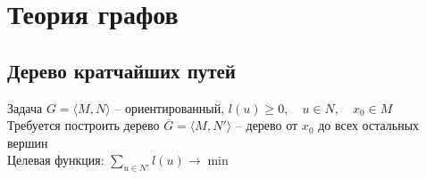 \chapter{Теория графов}

\section{Дерево кратчайших путей}

\begin{undefthm}{Задача}
    $ G = \langle M, N \rangle $ -- ориентированный, $ l(u) \ge 0, \quad u \in N, \quad x_0 \in M $ \\
    Требуется построить дерево $ \overline{G} = \langle M, N' \rangle $ -- дерево от $ x_0 $ до всех остальных вершин \\
    Целевая функция: $ \sum\limits_{u \in N'} l(u) \to \min $
\end{undefthm}

